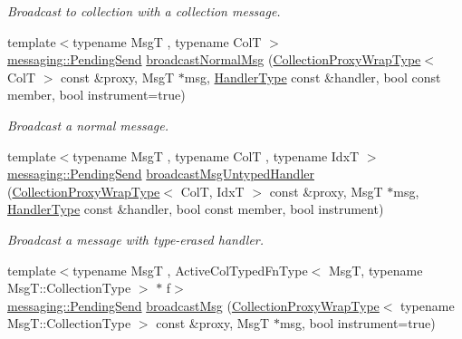 \begin{DoxyCompactItemize}
\begin{DoxyCompactList}\small\item\em Broadcast to collection with a collection message. \end{DoxyCompactList}\item 
{\footnotesize template$<$typename MsgT , typename ColT $>$ }\\\hyperlink{structvt_1_1messaging_1_1_pending_send}{messaging\+::\+Pending\+Send} \hyperlink{structvt_1_1vrt_1_1collection_1_1_collection_manager_ac5ebb9504dc55031027d8b0fbb96fe7e}{broadcast\+Normal\+Msg} (\hyperlink{structvt_1_1vrt_1_1collection_1_1_collection_manager_a56458ed7f9bb22b631b9b3a745f42f94}{Collection\+Proxy\+Wrap\+Type}$<$ ColT $>$ const \&proxy, MsgT $\ast$msg, \hyperlink{namespacevt_af64846b57dfcaf104da3ef6967917573}{Handler\+Type} const \&handler, bool const member, bool instrument=true)
\begin{DoxyCompactList}\small\item\em Broadcast a normal message. \end{DoxyCompactList}\item 
{\footnotesize template$<$typename MsgT , typename ColT , typename IdxT $>$ }\\\hyperlink{structvt_1_1messaging_1_1_pending_send}{messaging\+::\+Pending\+Send} \hyperlink{structvt_1_1vrt_1_1collection_1_1_collection_manager_a493c51ab40a4040d3a8671a02d2ae741}{broadcast\+Msg\+Untyped\+Handler} (\hyperlink{structvt_1_1vrt_1_1collection_1_1_collection_manager_a56458ed7f9bb22b631b9b3a745f42f94}{Collection\+Proxy\+Wrap\+Type}$<$ ColT, IdxT $>$ const \&proxy, MsgT $\ast$msg, \hyperlink{namespacevt_af64846b57dfcaf104da3ef6967917573}{Handler\+Type} const \&handler, bool const member, bool instrument)
\begin{DoxyCompactList}\small\item\em Broadcast a message with type-\/erased handler. \end{DoxyCompactList}\item 
{\footnotesize template$<$typename MsgT , Active\+Col\+Typed\+Fn\+Type$<$ Msg\+T, typename Msg\+T\+::\+Collection\+Type $>$ $\ast$ f$>$ }\\\hyperlink{structvt_1_1messaging_1_1_pending_send}{messaging\+::\+Pending\+Send} \hyperlink{structvt_1_1vrt_1_1collection_1_1_collection_manager_a9cadcebd1d7c26512091f9624a23a02c}{broadcast\+Msg} (\hyperlink{structvt_1_1vrt_1_1collection_1_1_collection_manager_a56458ed7f9bb22b631b9b3a745f42f94}{Collection\+Proxy\+Wrap\+Type}$<$ typename Msg\+T\+::\+Collection\+Type $>$ const \&proxy, MsgT $\ast$msg, bool instrument=true)

\end{DoxyCompactItemize}
